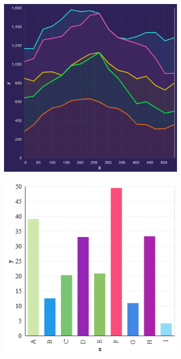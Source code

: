 \begin{figure}
    \centering
    \begin{subfigure}[b]{0.32\textwidth}
        \centering
        \includegraphics[width=\textwidth]{figures/body/procedure/area.png}
    \end{subfigure}
    \hfill
    \begin{subfigure}[b]{0.32\textwidth}
        \centering
        \includegraphics[width=\textwidth]{figures/body/procedure/bar.png}

\end{subfigure}
\end{figure}
